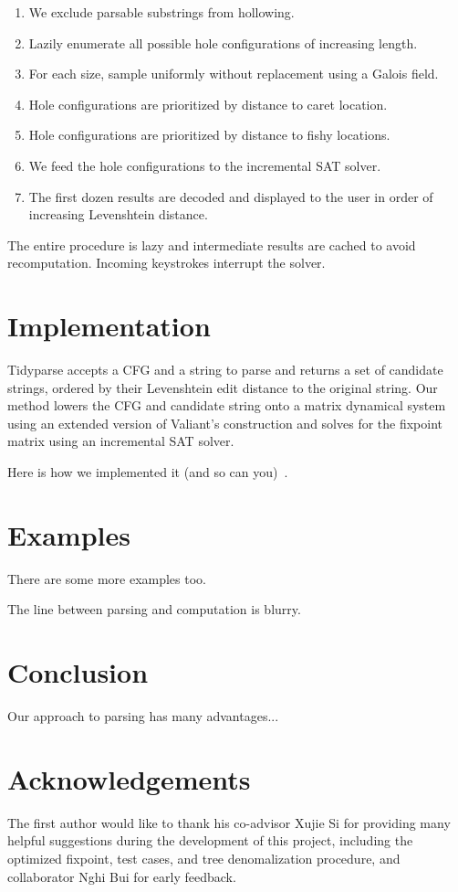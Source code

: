 \documentclass[sigplan,nonacm]{acmart}\settopmatter{printfolios=false,printccs=false,printacmref=false}
\begin{document}
\begin{enumerate}
  \item We exclude parsable substrings from hollowing.
  \item Lazily enumerate all possible hole configurations of increasing length.
  \item For each size, sample uniformly without replacement using a Galois field.
  \item Hole configurations are prioritized by distance to caret location.
  \item Hole configurations are prioritized by distance to fishy locations.
  \item We feed the hole configurations to the incremental SAT solver.
  \item The first dozen results are decoded and displayed to the user in order of increasing Levenshtein distance.
\end{enumerate}

The entire procedure is lazy and intermediate results are cached to avoid recomputation. Incoming keystrokes interrupt the solver.

\section{Implementation}

Tidyparse accepts a CFG and a string to parse and returns a set of candidate strings, ordered by their Levenshtein edit distance to the original string. Our method lowers the CFG and candidate string onto a matrix dynamical system using an extended version of Valiant's construction and solves for the fixpoint matrix using an incremental SAT solver.

    Here is how we implemented it (and so can you)~\cite{valiant1975general}.
\section{Examples}
There are some more examples too.

The line between parsing and computation is blurry.

\section{Conclusion}

Our approach to parsing has many advantages...

\section{Acknowledgements}
The first author would like to thank his co-advisor Xujie Si for providing many helpful suggestions during the development of this project, including the optimized fixpoint, test cases, and tree denomalization procedure, and collaborator Nghi Bui for early feedback.


\end{document}
